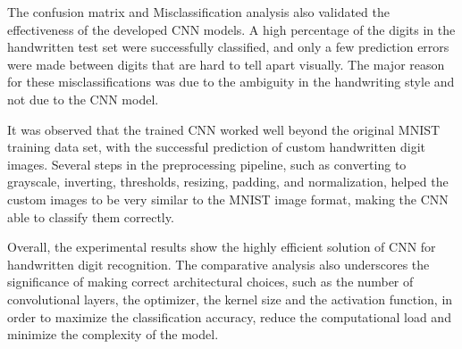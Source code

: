 The confusion matrix and Misclassification analysis also validated the effectiveness of the developed CNN models. A high percentage of the digits in the handwritten test set were successfully classified, and only a few prediction errors were made between digits that are hard to tell apart visually. The major reason for these misclassifications was due to the ambiguity in the handwriting style and not due to the CNN model.

It was observed that the trained CNN worked well beyond the original MNIST training data set, with the successful prediction of custom handwritten digit images. Several steps in the preprocessing pipeline, such as converting to grayscale, inverting, thresholds, resizing, padding, and normalization, helped the custom images to be very similar to the MNIST image format, making the CNN able to classify them correctly.

Overall, the experimental results show the highly efficient solution of CNN for handwritten digit recognition. The comparative analysis also underscores the significance of making correct architectural choices, such as the number of convolutional layers, the optimizer, the kernel size and the activation function, in order to maximize the classification accuracy, reduce the computational load and minimize the complexity of the model.
